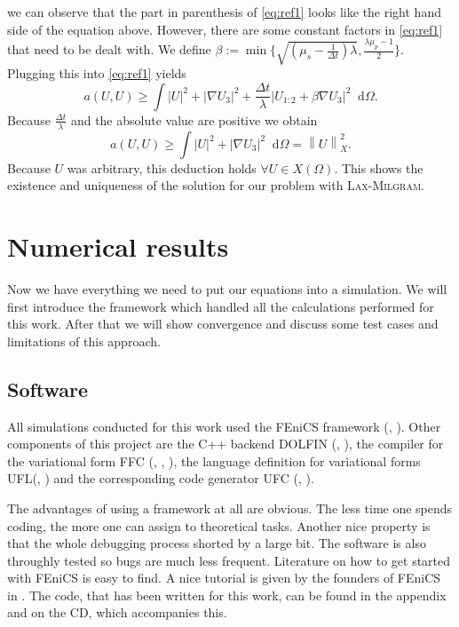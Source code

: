\documentclass[12pt,a4paper,twoside, open=right]{scrreprt}
\theoremstyle{definition}
\theoremstyle{plain}
\newcommand{\abs}[1]{\left\vert #1\right\vert}
\newcommand{\norm}[1]{\left\lVert#1\right\rVert}
\newcommand{\D}{\mathop{}\!\mathrm{d}}
\begin{document}
we can observe that the part in parenthesis of \eqref{eq:ref1} looks like the right hand side of the equation above. However, there are some constant factors in \eqref{eq:ref1} that need to be dealt with. We define $\beta:=\min\{\sqrt{(\mu_s-\frac{1}{\Delta t})\lambda},\frac{\lambda\mu_p-1}{2}\}$. Plugging this into \eqref{eq:ref1} yields
\begin{equation}
    a(U,U)\ge \int\abs{U}^2+\abs{\nabla U_3}^2+\frac{\Delta t}{\lambda}\abs{U_{1:2}+\beta\nabla U_3}^2\D\Omega.
\end{equation}
Because $\frac{\Delta t}{\lambda}$ and the absolute value are positive we obtain
\begin{equation}
    a(U,U)\ge\int\abs{U}^2+\abs{\nabla U_3}^2\D\Omega =\norm{U}_{X}^2.
\end{equation}
Because $U$ was arbitrary, this deduction holds $\forall U\in X(\Omega)$. This shows the existence and uniqueness of the solution for our problem with \textsc{Lax-Milgram}.
\chapter{Numerical results}
Now we have everything we need to put our equations into a simulation. We will first introduce the framework which handled all the calculations performed for this work. After that we will show convergence and discuss some test cases and limitations of this approach.
\section{Software}
All simulations conducted for this work used the FEniCS framework (\cite{AlnaesBlechta2015a}, \cite{LoggMardalEtAl2012a}). Other components of this project are the C++ backend DOLFIN (\cite{LoggWells2010a}, \cite{LoggWellsEtAl2012a}), the compiler for the variational form FFC (\cite{KirbyLogg2006a}, \cite{LoggOlgaardEtAl2012a}, \cite{OlgaardWells2010b}), the language definition for variational forms UFL(\cite{AlnaesEtAl2012}, \cite{Alnaes2012a}) and the corresponding code generator UFC (\cite{AlnaesLoggEtAl2009a}, \cite{AlnaesLoggEtAl2012a}).
\par 
The advantages of using a framework at all are obvious. The less time one spends coding, the more one can assign to theoretical tasks. Another nice property is that the whole debugging process shorted by a large bit. The software is also throughly tested so bugs are much less frequent. Literature on how to get started with FEniCS is easy to find. A nice tutorial is given by the founders of FEniCS in  \cite{Langtangen2017a}. The code, that has been written for this work, can be found in the appendix and on the CD, which accompanies this.
\end{document}
